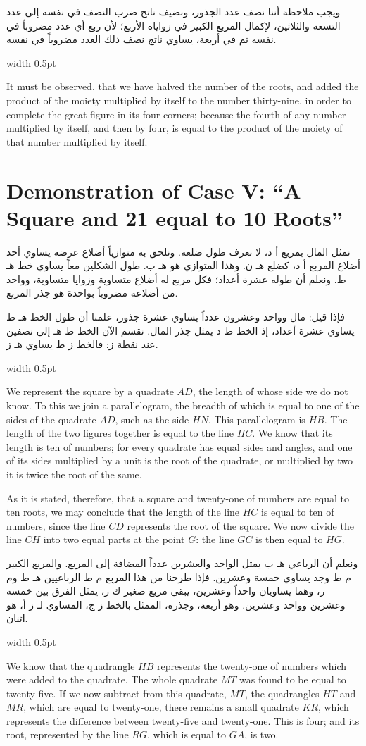 \documentclass[10pt,a4paper]{book}
\newlength{\colwidth}
\newcommand{\bilingualpair}[2]{%
  \noindent
  \begin{minipage}[t]{\colwidth}
  \begin{flushright}
  \vspace{0pt}
  {\arabicfont\small #1}
  \end{flushright}
  \end{minipage}%
  \hfill\textcolor{columnsepclr}{\vrule width 0.5pt}\hfill
  \begin{minipage}[t]{\colwidth}
  \vspace{0pt}
  {\small #2}
  \end{minipage}%
  \par\vspace{0.6em}
}
\begin{document}
\bilingualpair{
ويجب ملاحظة أننا نصف عدد الجذور، ونضيف ناتج ضرب النصف في
نفسه إلى عدد التسعة والثلاثين، لإكمال المربع الكبير في
زواياه الأربع؛ لأن ربع أي عدد مضروباً في نفسه ثم في أربعة،
يساوي ناتج نصف ذلك العدد مضروباً في نفسه.
}{
It must be observed, that we have halved the number of the roots, and added
the product of the moiety multiplied by itself to the number thirty-nine, in
order to complete the great figure in its four corners; because the fourth of
any number multiplied by itself, and then by four, is equal to the product of
the moiety of that number multiplied by itself.
}

\section{Demonstration of Case V: ``A Square and 21 equal to 10 Roots''}

\bilingualpair{
نمثل المال بمربع أ د، لا نعرف طول ضلعه. ونلحق به
متوازياً أضلاع عرضه يساوي أحد أضلاع المربع أ د، كضلع
هـ ن. وهذا المتوازي هو هـ ب. طول الشكلين معاً يساوي
خط هـ ط. ونعلم أن طوله عشرة أعداد؛ فكل مربع له
أضلاع متساوية وزوايا متساوية، وواحد من أضلاعه مضروباً
بواحدة هو جذر المربع.

فإذا قيل: مال وواحد وعشرون عدداً يساوي عشرة جذور، علمنا
أن طول الخط هـ ط يساوي عشرة أعداد، إذ الخط ط د يمثل
جذر المال. نقسم الآن الخط ط هـ إلى نصفين عند نقطة ز:
فالخط ز ط يساوي هـ ز.
}{
We represent the square by a quadrate $AD$, the length of whose side we do
not know. To this we join a parallelogram, the breadth of which is equal to
one of the sides of the quadrate $AD$, such as the side $HN$. This
parallelogram is $HB$. The length of the two figures together is equal to the
line $HC$. We know that its length is ten of numbers; for every quadrate has
equal sides and angles, and one of its sides multiplied by a unit is the root
of the quadrate, or multiplied by two it is twice the root of the same.

As it is stated, therefore, that a square and twenty-one of numbers are equal
to ten roots, we may conclude that the length of the line $HC$ is equal to
ten of numbers, since the line $CD$ represents the root of the square. We now
divide the line $CH$ into two equal parts at the point $G$: the line $GC$ is
then equal to $HG$.
}

\bilingualpair{
ونعلم أن الرباعي هـ ب يمثل الواحد والعشرين عدداً المضافة
إلى المربع. والمربع الكبير م ط وجد يساوي خمسة وعشرين.
فإذا طرحنا من هذا المربع م ط الرباعيين هـ ط وم ر، وهما
يساويان واحداً وعشرين، يبقى مربع صغير ك ر، يمثل الفرق بين
خمسة وعشرين وواحد وعشرين. وهو أربعة، وجذره، الممثل بالخط
ز ج، المساوي لـ ز أ، هو اثنان.
}{
We know that the quadrangle $HB$ represents the twenty-one of numbers which
were added to the quadrate. The whole quadrate $MT$ was found to be equal to
twenty-five. If we now subtract from this quadrate, $MT$, the quadrangles
$HT$ and $MR$, which are equal to twenty-one, there remains a small quadrate
$KR$, which represents the difference between twenty-five and twenty-one.
This is four; and its root, represented by the line $RG$, which is equal to
$GA$, is two.
}
\end{document}
